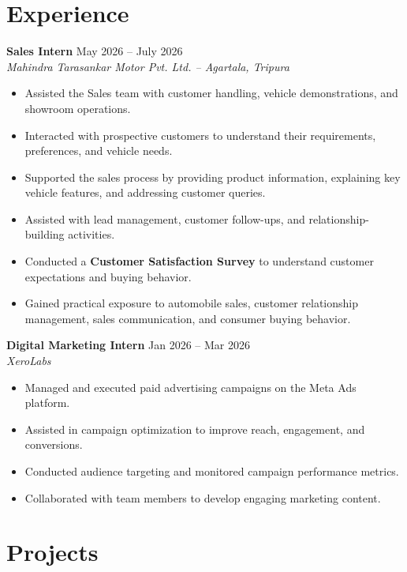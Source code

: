 \documentclass[a4paper,10pt]{article}
\begin{document}
\section*{Experience}

\textbf{Sales Intern} \hfill May 2026 -- July 2026 \\
\textit{Mahindra Tarasankar Motor Pvt. Ltd. -- Agartala, Tripura}

\begin{itemize}
    \item Assisted the Sales team with customer handling, vehicle demonstrations, and showroom operations.
    \item Interacted with prospective customers to understand their requirements, preferences, and vehicle needs.
    \item Supported the sales process by providing product information, explaining key vehicle features, and addressing customer queries.
    \item Assisted with lead management, customer follow-ups, and relationship-building activities.
    \item Conducted a \textbf{Customer Satisfaction Survey} to understand customer expectations and buying behavior.
    \item Gained practical exposure to automobile sales, customer relationship management, sales communication, and consumer buying behavior.
\end{itemize}

\vspace{4pt}

\textbf{Digital Marketing Intern} \hfill Jan 2026 -- Mar 2026 \\
\textit{XeroLabs}

\begin{itemize}
    \item Managed and executed paid advertising campaigns on the Meta Ads platform.
    \item Assisted in campaign optimization to improve reach, engagement, and conversions.
    \item Conducted audience targeting and monitored campaign performance metrics.
    \item Collaborated with team members to develop engaging marketing content.
\end{itemize}

\section*{Projects}
\end{document}
